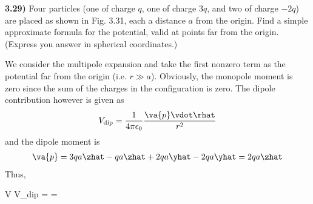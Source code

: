 \documentclass[12pt,a4paper]{article}
\newcommand{\prob}[2]{\textbf{#1)} #2}
\begin{document}
\prob{3.29}{Four particles (one of charge $q$, one of charge $3q$, and two of charge $-2q$) are placed as shown in Fig. 3.31, each a distance $a$ from the origin. Find a simple approximate formula for the potential, valid at points far from the origin. (Express you answer in spherical coordinates.)}

We consider the multipole expansion and take the first nonzero term as the potential far from the origin (i.e. $r \gg a$). Obviously, the monopole moment is zero since the sum of the charges in the configuration is zero. The dipole contribution however is given as
\begin{align*}
V_{\rm dip} = \frac{1}{4\pi\epsilon_0}\frac{\va{p} \vdot \rhat}{r^2}
\end{align*}
and the dipole moment is
\begin{align*}
\va{p} = 3qa\zhat - qa\zhat + 2qa\yhat - 2qa\yhat = 2qa\zhat
\end{align*}
Thus,
\begin{eqbox}
V \approx V_{\rm dip} =  = 
\end{eqbox}
\end{document}
